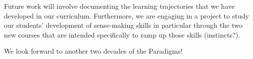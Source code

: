 \documentclass[english,aps,pra,reprint,noshowpacs,superscriptaddress]{revtex4-1}
\begin{document}
Future work will involve documenting the learning trajectories that we
have developed in our curriculum.  Furthermore, we are engaging in a
project to study our students' development of sense-making skills in
particular through the two new courses that are intended specifically
to ramp up those skills (instincts?).

We look forward to another two decades of the Paradigms!




\end{document}
